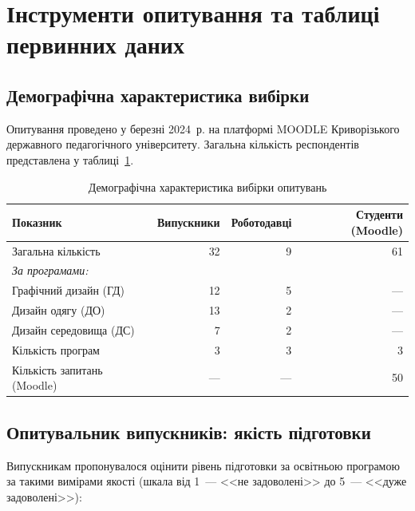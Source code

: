 \section{Інструменти опитування та таблиці первинних даних}\label{app:surveys}

\subsection{Демографічна характеристика вибірки}

Опитування проведено у березні 2024~р. на платформі MOODLE Криворізького державного педагогічного університету. Загальна кількість респондентів представлена у таблиці~\ref{tab:app-demographics}.

\begin{table}[htbp]
\centering
\caption{Демографічна характеристика вибірки опитувань}\label{tab:app-demographics}
\small
\begin{tabularx}{\textwidth}{@{}Xrrr@{}}
\toprule
\textbf{Показник} & \textbf{Випускники} & \textbf{Роботодавці} & \textbf{Студенти (Moodle)} \\
\midrule
Загальна кількість & 32 & 9 & 61 \\
\addlinespace
\textit{За програмами:} & & & \\
\quad Графічний дизайн (ГД) & 12 & 5 & --- \\
\quad Дизайн одягу (ДО) & 13 & 2 & --- \\
\quad Дизайн середовища (ДС) & 7 & 2 & --- \\
\addlinespace
Кількість програм & 3 & 3 & 3 \\
Кількість запитань (Moodle) & --- & --- & 50 \\
\bottomrule
\end{tabularx}
\end{table}

\subsection{Опитувальник випускників: якість підготовки}

Випускникам пропонувалося оцінити рівень підготовки за освітньою програмою за такими вимірами якості (шкала від 1~--- <<не задоволені>> до 5~--- <<дуже задоволені>>):

